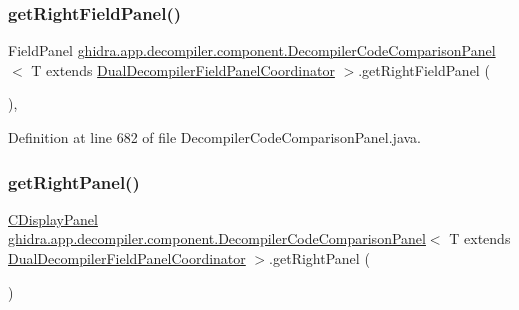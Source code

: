 \subsubsection{\texorpdfstring{getRightFieldPanel()}{getRightFieldPanel()}}
{\footnotesize\ttfamily Field\+Panel \mbox{\hyperlink{classghidra_1_1app_1_1decompiler_1_1component_1_1_decompiler_code_comparison_panel}{ghidra.\+app.\+decompiler.\+component.\+Decompiler\+Code\+Comparison\+Panel}}$<$ T extends \mbox{\hyperlink{classghidra_1_1app_1_1decompiler_1_1component_1_1_dual_decompiler_field_panel_coordinator}{Dual\+Decompiler\+Field\+Panel\+Coordinator}} $>$.get\+Right\+Field\+Panel (\begin{DoxyParamCaption}{ }\end{DoxyParamCaption})\hspace{0.3cm}{\ttfamily [inline]}, {\ttfamily [protected]}}



Definition at line 682 of file Decompiler\+Code\+Comparison\+Panel.\+java.

\mbox{\label{classghidra_1_1app_1_1decompiler_1_1component_1_1_decompiler_code_comparison_panel_ae54faae55e80766a4e4f0f700ee7c1c0}} 
\subsubsection{\texorpdfstring{getRightPanel()}{getRightPanel()}}
{\footnotesize\ttfamily \mbox{\hyperlink{classghidra_1_1app_1_1decompiler_1_1component_1_1_c_display_panel}{C\+Display\+Panel}} \mbox{\hyperlink{classghidra_1_1app_1_1decompiler_1_1component_1_1_decompiler_code_comparison_panel}{ghidra.\+app.\+decompiler.\+component.\+Decompiler\+Code\+Comparison\+Panel}}$<$ T extends \mbox{\hyperlink{classghidra_1_1app_1_1decompiler_1_1component_1_1_dual_decompiler_field_panel_coordinator}{Dual\+Decompiler\+Field\+Panel\+Coordinator}} $>$.get\+Right\+Panel (\begin{DoxyParamCaption}{ }\end{DoxyParamCaption})\hspace{0.3cm}{\ttfamily [inline]}}

